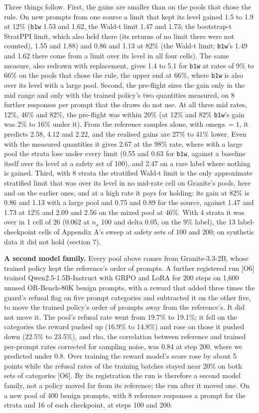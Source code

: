 \documentclass[11pt]{article}
\begin{document}
Three things follow. First, the gains are smaller than on the pools that chose the rule. On new prompts from one source a limit that kept its level gained 1.5 to 1.9 at 12\% (\texttt{b1w} 1.53 and 1.62, the Wald-t limit 1.47 and 1.73; the bootstrap-t StratPPI limit, which also held there (its returns of no limit there were not counted), 1.55 and 1.88) and 0.86 and 1.13 at 82\% (the Wald-t limit; \texttt{b1w}'s 1.49 and 1.62 there come from a limit over its level in all four cells). The same measure, also redrawn with replacement, gives 1.4 to 5.1 for \texttt{b1w} at rates of 9\% to 66\% on the pools that chose the rule, the upper end at 66\%, where \texttt{b1w} is also over its level with a large pool. Second, the pre-flight sizes the gain only in the mid range and only with the trained policy's two quantities measured, on 8 further responses per prompt that the draws do not use. At all three mid rates, 12\%, 46\% and 82\%, the pre-flight was within 20\% (at 12\% and 82\% \texttt{b1w}'s gain was 2\% to 16\% under it). From the reference samples alone, with $\text{omega}\ = 1$, it predicts 2.58, 4.12 and 2.22, and the realised gains are 27\% to 41\% lower. Even with the measured quantities it gives 2.67 at the 98\% rate, where with a large pool the strata lose under every limit (0.55 and 0.63 for \texttt{b1w}, against a baseline itself over its level at a safety set of 100), and 2.47 on a rare label where nothing is gained. Third, with 8 strata the stratified Wald-t limit is the only approximate stratified limit that was over its level in no mid-rate cell on Granite's pools, here and on the earlier ones, and at a high rate it pays for holding: its gain at 82\% is 0.86 and 1.13 with a large pool and 0.75 and 0.89 for the source, against 1.47 and 1.73 at 12\% and 2.09 and 2.56 on the mixed pool at 46\%. With 4 strata it was over in 1 cell of 26 (0.062 at $n_{s}$ 100 and delta 0.05, on the 9\% label), the 13 label-checkpoint cells of Appendix A's sweep at safety sets of 100 and 200; on synthetic data it did not hold (section 7).


\textbf{A second model family.} Every pool above comes from Granite-3.3-2B, whose trained policy kept the reference's order of prompts. A further registered run [O6] trained Qwen2.5-1.5B-Instruct with GRPO and LoRA for 200 steps on 1,600 unused OR-Bench-80K benign prompts, with a reward that added three times the guard's refusal flag on five prompt categories and subtracted it on the other five, to move the trained policy's order of prompts away from the reference's. It did not move it. The pool's refusal rate went from 19.7\% to 19.1\%; it fell on the categories the reward pushed up (16.9\% to 14.8\%) and rose on those it pushed down (22.5\% to 23.5\%), and rho, the correlation between reference and trained per-prompt rates corrected for sampling noise, was 0.84 at step 200, where we predicted under 0.8. Over training the reward model's score rose by about 5 points while the refusal rates of the training batches stayed near 20\% on both sets of categories [O6]. By its registration the run is therefore a second model family, not a policy moved far from its reference; the run after it moved one. On a new pool of 400 benign prompts, with 8 reference responses a prompt for the strata and 16 of each checkpoint, at steps 100 and 200:
\end{document}
